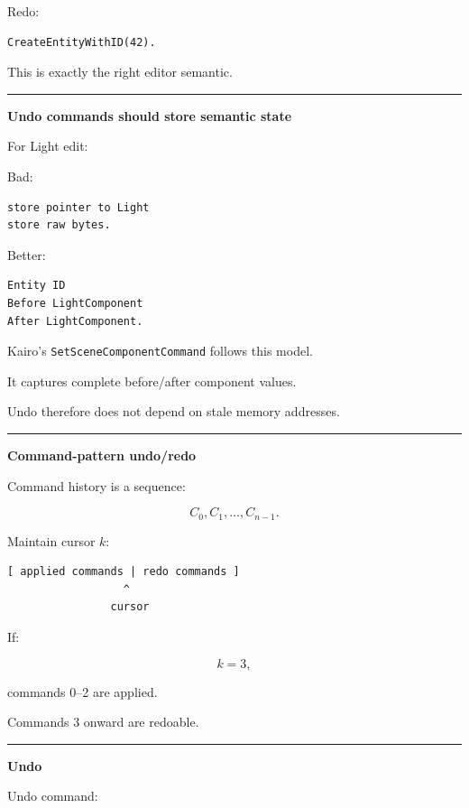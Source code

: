 Redo:

\begin{verbatim}
CreateEntityWithID(42).
\end{verbatim}

This is exactly the right editor semantic.

\begin{center}\rule{0.5\linewidth}{0.5pt}\end{center}

\textbf{Undo commands should store semantic state}

For Light edit:

Bad:

\begin{verbatim}
store pointer to Light
store raw bytes.
\end{verbatim}

Better:

\begin{verbatim}
Entity ID
Before LightComponent
After LightComponent.
\end{verbatim}

Kairo's \texttt{SetSceneComponentCommand} follows this model.

It captures complete before/after component values.

Undo therefore does not depend on stale memory addresses.

\begin{center}\rule{0.5\linewidth}{0.5pt}\end{center}

\textbf{Command-pattern undo/redo}

Command history is a sequence:

\[
C_0,C_1,\dots,C_{n-1}.
\]

Maintain cursor \(k\):

\begin{verbatim}
[ applied commands | redo commands ]
                  ^
                cursor
\end{verbatim}

If:

\[
k=3,
\]

commands 0--2 are applied.

Commands 3 onward are redoable.

\begin{center}\rule{0.5\linewidth}{0.5pt}\end{center}

\textbf{Undo}

Undo command:

